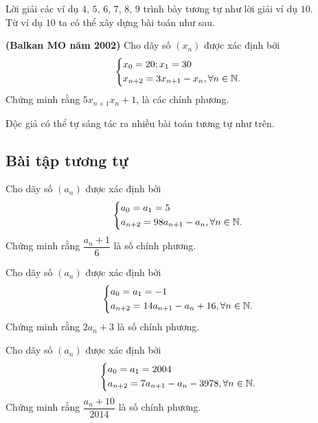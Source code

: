 Lời giải các ví dụ $4$, $5$, $6$, $7$, $8$, $9$ trình bày tương tự như lời giải ví dụ $10$.\\
 Từ ví dụ $10$ ta có thể xây dựng bài toán như sau.
\begin{vd}\textbf{(Balkan MO năm 2002)}%
	Cho dãy số $(x_n)$ được xác định bởi
	$$\left\{\begin{aligned}&x_0=20;x_1=30\\&x_{n+2}=3x_{n+1}-x_n,\forall n\in\mathbb{N}.\end{aligned}\right.$$
	Chứng minh rằng $5x_{n+1}x_n+1$, là các chính phương.
\end{vd}
Độc giả có thể tự sáng tác ra nhiều bài toán tương tự như trên.
\subsection{Bài tập tương tự}
\begin{bt}%
	Cho dãy số $(a_n)$ được xác định bởi
	$$\left\{\begin{aligned}&a_0=a_1=5\\&a_{n+2}=98a_{n+1}-a_n, \forall n\in\mathbb{N}.\end{aligned}\right.$$
	Chứng minh rằng $\dfrac{a_n+1}{6}$ là số chính phương.
\end{bt}

\begin{bt}%
	Cho dãy số $(a_n)$ được xác định bởi
	$$\left\{\begin{aligned}&a_0=a_1=-1\\&a_{n+2}=14a_{n+1}-a_n+16, \forall n\in\mathbb{N}.\end{aligned}\right.$$
	Chứng minh rằng $2a_n+3$ là số chính phương.
\end{bt}

\begin{bt}%
	Cho dãy số $(a_n)$ được xác định bởi
	$$\left\{\begin{aligned}&a_0=a_1=2004\\&a_{n+2}=7a_{n+1}-a_n-3978, \forall n\in\mathbb{N}.\end{aligned}\right.$$
	Chứng minh rằng $\dfrac{a_n+10}{2014}$ là số chính phương.
\end{bt}


